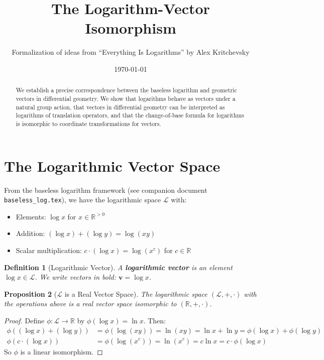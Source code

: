 \documentclass[11pt]{article}
\title{The Logarithm-Vector Isomorphism}
\author{Formalization of ideas from ``Everything Is Logarithms'' by Alex Kritchevsky}
\date{\today}
\newtheorem{definition}{Definition}[section]
\newtheorem{proposition}[definition]{Proposition}
\begin{document}
\maketitle

\begin{abstract}
We establish a precise correspondence between the baseless logarithm and geometric vectors in differential geometry. We show that logarithms behave as vectors under a natural group action, that vectors in differential geometry can be interpreted as logarithms of translation operators, and that the change-of-base formula for logarithms is isomorphic to coordinate transformations for vectors.
\end{abstract}

\tableofcontents
\newpage

\section{The Logarithmic Vector Space}
\label{sec:log-vector}

From the baseless logarithm framework (see companion document \texttt{baseless\_log.tex}), we have the logarithmic space $\mathcal{L}$ with:
\begin{itemize}
\item Elements: $\log x$ for $x \in \mathbb{R}^{>0}$
\item Addition: $(\log x) + (\log y) = \log(xy)$
\item Scalar multiplication: $c \cdot (\log x) = \log(x^c)$ for $c \in \mathbb{R}$
\end{itemize}

\begin{definition}[Logarithmic Vector]
A \textbf{logarithmic vector} is an element $\log x \in \mathcal{L}$. We write vectors in bold: $\mathbf{v} = \log x$.
\end{definition}

\begin{proposition}[$\mathcal{L}$ is a Real Vector Space]
The logarithmic space $(\mathcal{L}, +, \cdot)$ with the operations above is a real vector space isomorphic to $(\mathbb{R}, +, \cdot)$.
\end{proposition}

\begin{proof}
Define $\phi: \mathcal{L} \to \mathbb{R}$ by $\phi(\log x) = \ln x$. Then:
\begin{align*}
\phi((\log x) + (\log y)) &= \phi(\log(xy)) = \ln(xy) = \ln x + \ln y = \phi(\log x) + \phi(\log y) \\
\phi(c \cdot (\log x)) &= \phi(\log(x^c)) = \ln(x^c) = c \ln x = c \cdot \phi(\log x)
\end{align*}
So $\phi$ is a linear isomorphism.
\end{proof}
\end{document}

